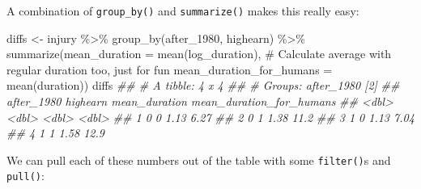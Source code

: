\documentclass[
  letterpaper,
  DIV=11,
  numbers=noendperiod]{scrartcl}
\newenvironment{Shaded}{\begin{snugshade}}{\end{snugshade}}
\newcommand{\AttributeTok}[1]{\textcolor[rgb]{0.40,0.45,0.13}{#1}}
\newcommand{\CommentTok}[1]{\textcolor[rgb]{0.37,0.37,0.37}{#1}}
\newcommand{\DocumentationTok}[1]{\textcolor[rgb]{0.37,0.37,0.37}{\textit{#1}}}
\newcommand{\FunctionTok}[1]{\textcolor[rgb]{0.28,0.35,0.67}{#1}}
\newcommand{\NormalTok}[1]{\textcolor[rgb]{0.00,0.23,0.31}{#1}}
\newcommand{\OtherTok}[1]{\textcolor[rgb]{0.00,0.23,0.31}{#1}}
\newcommand{\SpecialCharTok}[1]{\textcolor[rgb]{0.37,0.37,0.37}{#1}}
\begin{document}
A combination of \texttt{group\_by()} and \texttt{summarize()} makes
this really easy:

\begin{Shaded}
\begin{Highlighting}[]
\NormalTok{diffs }\OtherTok{\textless{}{-}}\NormalTok{ injury }\SpecialCharTok{\%\textgreater{}\%}
  \FunctionTok{group\_by}\NormalTok{(after\_1980, highearn) }\SpecialCharTok{\%\textgreater{}\%}
  \FunctionTok{summarize}\NormalTok{(}\AttributeTok{mean\_duration =} \FunctionTok{mean}\NormalTok{(log\_duration),}
            \CommentTok{\# Calculate average with regular duration too, just for fun}
            \AttributeTok{mean\_duration\_for\_humans =} \FunctionTok{mean}\NormalTok{(duration))}
\NormalTok{diffs}
\DocumentationTok{\#\# \# A tibble: 4 x 4}
\DocumentationTok{\#\# \# Groups:   after\_1980 [2]}
\DocumentationTok{\#\#   after\_1980 highearn mean\_duration mean\_duration\_for\_humans}
\DocumentationTok{\#\#        \textless{}dbl\textgreater{}    \textless{}dbl\textgreater{}         \textless{}dbl\textgreater{}                    \textless{}dbl\textgreater{}}
\DocumentationTok{\#\# 1          0        0          1.13                     6.27}
\DocumentationTok{\#\# 2          0        1          1.38                    11.2 }
\DocumentationTok{\#\# 3          1        0          1.13                     7.04}
\DocumentationTok{\#\# 4          1        1          1.58                    12.9}
\end{Highlighting}
\end{Shaded}

We can pull each of these numbers out of the table with some
\texttt{filter()}s and \texttt{pull()}:
\end{document}
